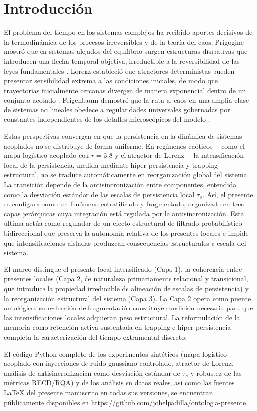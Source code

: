 \section{Introducción}

El problema del tiempo en los sistemas complejos ha recibido aportes decisivos de la termodinámica de los procesos irreversibles y de la teoría del caos. Prigogine mostró que en sistemas alejados del equilibrio surgen estructuras disipativas que introducen una flecha temporal objetiva, irreductible a la reversibilidad de las leyes fundamentales \citep{prigogine_being_to_becoming_1980,prigogine_stengers_order_out_chaos}. Lorenz estableció que atractores deterministas pueden presentar sensibilidad extrema a las condiciones iniciales, de modo que trayectorias inicialmente cercanas divergen de manera exponencial dentro de un conjunto acotado \citep{lorenz_deterministic_nonperiodic_1963}. Feigenbaum demostró que la ruta al caos en una amplia clase de sistemas no lineales obedece a regularidades universales gobernadas por constantes independientes de los detalles microscópicos del modelo \citep{feigenbaum_quantitative_universality_1978}.

Estas perspectivas convergen en que la persistencia en la dinámica de sistemas acoplados no se distribuye de forma uniforme. En regímenes caóticos —como el mapa logístico acoplado con $r=3.8$ y el atractor de Lorenz— la intensificación local de la persistencia, medida mediante hiper-persistencia y trapping estructural, no se traduce automáticamente en reorganización global del sistema. La transición depende de la antisincronización entre componentes, entendida como la desviación estándar de las escalas de persistencia local $\tau_s$. Así, el presente se configura como un fenómeno estratificado y fragmentado, organizado en tres capas jerárquicas cuya integración está regulada por la antisincronización. Esta última actúa como regulador de un efecto estructural de filtrado probabilístico bidireccional que preserva la autonomía relativa de los presentes locales e impide que intensificaciones aisladas produzcan consecuencias estructurales a escala del sistema.

El marco distingue el presente local intensificado (Capa 1), la coherencia entre presentes locales (Capa 2, de naturaleza primariamente relacional y transicional, que introduce la propiedad irreducible de alineación de escalas de persistencia) y la reorganización estructural del sistema (Capa 3). La Capa 2 opera como puente ontológico: su reducción de fragmentación constituye condición necesaria para que las intensificaciones locales adquieran peso estructural. La reformulación de la memoria como retención activa sustentada en trapping e hiper-persistencia completa la caracterización del tiempo extramental discreto.

El código Python completo de los experimentos sintéticos (mapa logístico acoplado con inyecciones de ruido gaussiano controlado, atractor de Lorenz, análisis de antisincronización como desviación estándar de $\tau_s$ y robustez de las métricas RECD/RQA) y de los análisis en datos reales, así como las fuentes LaTeX del presente manuscrito en todas sus versiones, se encuentran públicamente disponibles en \url{https://github.com/johelpadilla/ontologia-presente}.